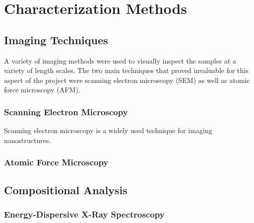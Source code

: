 \chapter{Characterization Methods}
\label{ch:characterization}
\thispagestyle{empty}


\section{Imaging Techniques}

A variety of imaging methods were used to visually inspect the samples at a variety of length scales. The two main techniques that proved invaluable for this aspect of the project were scanning electron microscopy (SEM) as well as atomic force microscopy (AFM). 


\subsection{Scanning Electron Microscopy}

Scanning electron microscopy is a widely used technique for imaging nanostructures. 

\lipsum


	
\subsection{Atomic Force Microscopy}
	
\lipsum


\section{Compositional Analysis}


\subsection{Energy-Dispersive X-Ray Spectroscopy}

	


